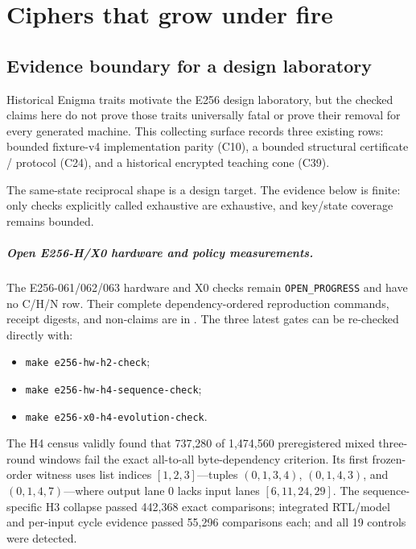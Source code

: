 \chapter{Ciphers that grow under fire}
\label{ch:pillariii}


\section{Evidence boundary for a design laboratory}

Historical Enigma traits motivate the E256 design laboratory, but the checked
claims here do not prove those traits universally fatal or prove their removal
for every generated machine. This collecting surface records three existing
rows: bounded fixture-v4 implementation parity (C10), a bounded structural
certificate / protocol (C24), and a historical encrypted teaching cone (C39).

The same-state reciprocal shape is a design target. The evidence below is
finite: only checks explicitly called exhaustive are exhaustive, and key/state
coverage remains bounded.

\paragraph{Open E256-H/X0 hardware and policy measurements.}
The E256-061/062/063 hardware and X0 checks remain
\texttt{OPEN\_PROGRESS} and have no C/H/N row. Their complete dependency-ordered
reproduction commands, receipt digests, and non-claims are in
. The three latest gates can be re-checked directly with:
\begin{itemize}[nosep]
  \item \texttt{make e256-hw-h2-check};
  \item \texttt{make e256-hw-h4-sequence-check};
  \item \texttt{make e256-x0-h4-evolution-check}.
\end{itemize}
The H4 census validly found that 737,280 of 1,474,560 preregistered mixed
three-round windows fail the exact all-to-all byte-dependency criterion. Its
first frozen-order witness uses list indices $[1,2,3]$---tuples
$(0,1,3,4)$, $(0,1,4,3)$, and $(0,1,4,7)$---where output lane 0 lacks input
lanes $[6,11,24,29]$. The sequence-specific H3 collapse passed 442,368 exact
comparisons; integrated RTL/model and per-input cycle evidence passed 55,296
comparisons each; and all 19 controls were detected.

